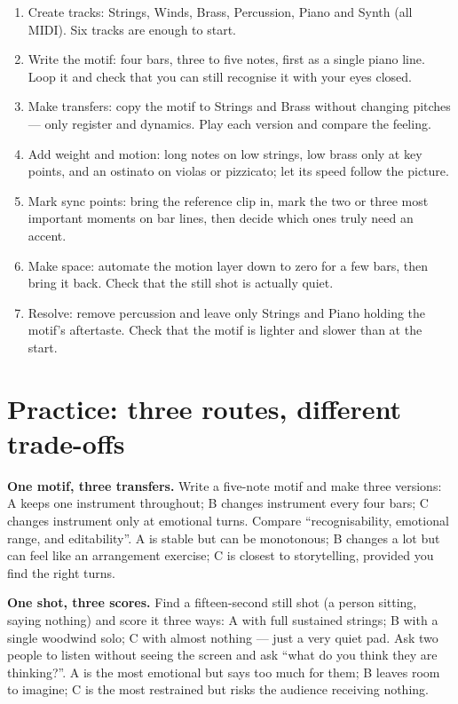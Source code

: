 \begin{enumerate}
\item Create tracks: Strings, Winds, Brass, Percussion, Piano and Synth (all MIDI). Six tracks are enough to start.
\item Write the motif: four bars, three to five notes, first as a single piano line. Loop it and check that you can still recognise it with your eyes closed.
\item Make transfers: copy the motif to Strings and Brass without changing pitches --- only register and dynamics. Play each version and compare the feeling.
\item Add weight and motion: long notes on low strings, low brass only at key points, and an ostinato on violas or pizzicato; let its speed follow the picture.
\item Mark sync points: bring the reference clip in, mark the two or three most important moments on bar lines, then decide which ones truly need an accent.
\item Make space: automate the motion layer down to zero for a few bars, then bring it back. Check that the still shot is actually quiet.
\item Resolve: remove percussion and leave only Strings and Piano holding the motif's aftertaste. Check that the motif is lighter and slower than at the start.
\end{enumerate}

\section{Practice: three routes, different trade-offs}
\label{sec:film-practice}

\begin{exercise}
\textbf{One motif, three transfers.} Write a five-note motif and make three versions: A keeps one instrument throughout; B changes instrument every four bars; C changes instrument only at emotional turns. Compare ``recognisability, emotional range, and editability''. A is stable but can be monotonous; B changes a lot but can feel like an arrangement exercise; C is closest to storytelling, provided you find the right turns.
\end{exercise}

\begin{exercise}
\textbf{One shot, three scores.} Find a fifteen-second still shot (a person sitting, saying nothing) and score it three ways: A with full sustained strings; B with a single woodwind solo; C with almost nothing --- just a very quiet pad. Ask two people to listen without seeing the screen and ask ``what do you think they are thinking?''. A is the most emotional but says too much for them; B leaves room to imagine; C is the most restrained but risks the audience receiving nothing.
\end{exercise}

